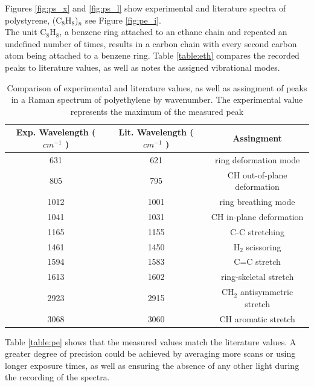     Figures \ref{fig:ps_x} and \ref{fig:ps_l} show experimental and literature spectra of polystyrene, (C\(_8\)H\(_8\))\(_n\) see Figure \ref{fig:pe_i}.\\ 
    The unit C\(_8\)H\(_8\), a benzene ring attached to an ethane chain and repeated an undefined number of times, results in a carbon chain with every second carbon atom being attached to a benzene ring. Table \ref{table:eth} compares the recorded peaks to literature values, as well as notes the assigned vibrational modes. 

    \begin{table}[h]
    \begin{center}
        \vspace{15pt}
        \begin{tabular}{|c|c|c|}
         \hline
         Exp. Wavelength (\( cm^{-1} \) ) & Lit. Wavelength  (\( cm^{-1} \) ) & Assingment  \\ 
         \hline
         631 & 621 & ring deformation mode \\
         805 & 795 & CH out-of-plane deformation \\
         1012 & 1001 & ring breathing mode\\ 
         1041 & 1031 & CH in-plane deformation \\
         1165 & 1155 & C-C stretching\\
         1461 & 1450 & H\(_2\) scissoring\\
         1594 & 1583 & C=C stretch\\
         1613 & 1602 & ring-skeletal stretch\\
         2923 & 2915 & CH\(_2\) antisymmetric stretch\\
         3068 & 3060 & CH aromatic stretch  \\
         \hline
        \end{tabular}
        \caption{Comparison of experimental and literature \cite{ps1} \cite{ps2} values, as well as assingment of peaks in a Raman spectrum of polyethylene by wavenumber. The experimental value represents the maximum of the measured peak }
        \label{table:ps}
    \end{center}
    \end{table}

    Table \ref{table:pe} shows that the measured values match the literature values. A greater degree of precision could be achieved by averaging more scans or using longer exposure times, as well as ensuring the absence of any other light during the recording of the spectra.

